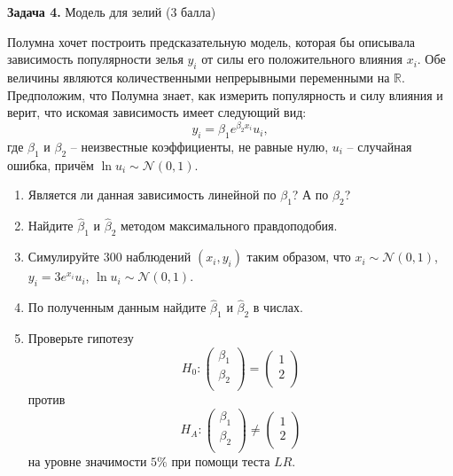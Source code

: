\documentclass[10pt, a4paper]{extarticle}
\def \R{\mathbb{R}}
\begin{document}
	
	{\Large \textbf{Задача 4.} Модель для зелий (3 балла)}
	
	Полумна хочет построить предсказательную модель, которая бы описывала зависимость популярности зелья $y_i$ от силы его положительного влияния $x_i$.
	Обе величины являются количественными непрерывными переменными на $\R$.
	Предположим, что Полумна знает, как измерить популярность и силу влияния и верит, что искомая зависимость имеет следующий вид:
	\[
	y_i = \beta_1 e^{\beta_2 x_i}u_i,
	\]
	где $\beta_1$ и $\beta_2$ -- неизвестные коэффициенты, не равные нулю, $u_i $ -- случайная ошибка, причём $\ln u_i \sim \mathcal{N}(0,1)$.
	
	\begin{enumerate}[label=\textbf{\alph*)}]
		\item Является ли данная зависимость линейной по $\beta_1$?
		А по $\beta_2$?
		\item Найдите $\hat{\beta}_1$ и $\hat{\beta}_2$ методом максимального правдоподобия. 
		\item Симулируйте $300$ наблюдений $(x_i, y_i)$ таким образом, что $x_i \sim \mathcal{N}(0, 1)$, $y_i = 3e^{x_i}u_i$, $\ln u_i \sim \mathcal{N}(0, 1)$.
		\item По полученным данным найдите $\hat{\beta}_1$ и $\hat{\beta}_2$ в числах.
		\item Проверьте гипотезу
		\[
		H_0: \begin{pmatrix}
			\beta_1 \\
			\beta_2 \\
		\end{pmatrix} = 
		\begin{pmatrix}
			1 \\
			2 \\
		\end{pmatrix}
		\]
		против
		\[
		 H_A: \begin{pmatrix}
			\beta_1 \\
			\beta_2 \\
		\end{pmatrix} \ne
		\begin{pmatrix}
			1 \\
			2 \\
		\end{pmatrix}
		\]
		на уровне значимости $5\%$ при помощи теста $LR$.
	\end{enumerate}
	
\end{document}
